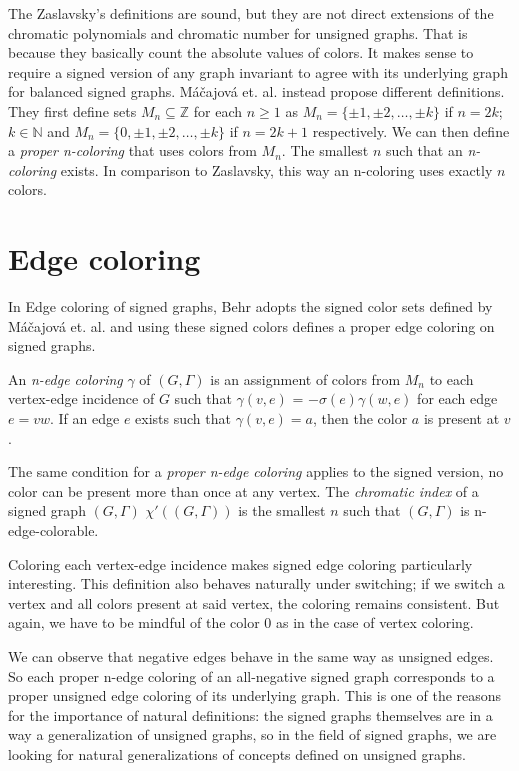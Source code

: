 The Zaslavsky's definitions are sound, but they are not direct extensions of the chromatic polynomials and chromatic number for 
unsigned graphs. That is because they basically count the absolute values of colors. It makes sense to require a signed version of any graph invariant to agree with its underlying graph for balanced signed graphs.
Máčajová et. al.\cite{chromatic-number} instead propose different definitions.
They first define sets $M_n \subseteq \mathbb{Z}$ for each $n \geq 1$ as $M_n = \{\pm 1, \pm 2, \dots , \pm k\}$ if $n = 2k$; $k \in \mathbb{N}$
and $M_n = \{0, \pm 1, \pm 2, \dots , \pm k\}$ if $n = 2k + 1$ respectively.
We can then define a \textit{proper n-coloring} that uses colors from $M_n$. The smallest $n$ such that 
an \textit{n-coloring} exists. In comparison to Zaslavsky, this way an n-coloring uses exactly $n$ colors.

\section{Edge coloring}

In Edge coloring of signed graphs\cite{behr-edge-coloring}, Behr adopts the signed color sets defined by Máčajová et. al. and using these signed colors 
defines a proper edge coloring on signed graphs.

An \textit{n-edge coloring} $\gamma$ of $(G, \Gamma)$ is an assignment of colors from $M_n$ to each vertex-edge incidence of $G$ such that $\gamma (v, e)$ = $- \sigma (e) \gamma(w,e)$ for each edge $e = vw$.
If an edge $e$ exists such that $\gamma (v,e) = a$, then the color $a$ is present at $v$.

The same condition for a \textit{proper n-edge coloring} applies to the signed version, no color can be present more than once at any vertex.
The \textit{chromatic index} of a signed graph $(G, \Gamma)$ $\chi ' ((G, \Gamma))$ is the smallest $n$ such that $(G, \Gamma)$ is n-edge-colorable.

Coloring each vertex-edge incidence makes signed edge coloring particularly interesting. 
This definition also behaves naturally under switching; if we switch a vertex and all colors present at said vertex, the coloring remains consistent.
But again, we have to be mindful of the color $0$ as in the case of vertex coloring.

We can observe that negative edges behave in the same way as unsigned edges. 
So each proper n-edge coloring of an all-negative signed graph corresponds to a proper unsigned edge coloring of its underlying graph.
This is one of the reasons for the importance of natural definitions: the signed graphs themselves are in a way a generalization of unsigned graphs, so in the field of signed graphs, we are looking for natural generalizations
of concepts defined on unsigned graphs. 
